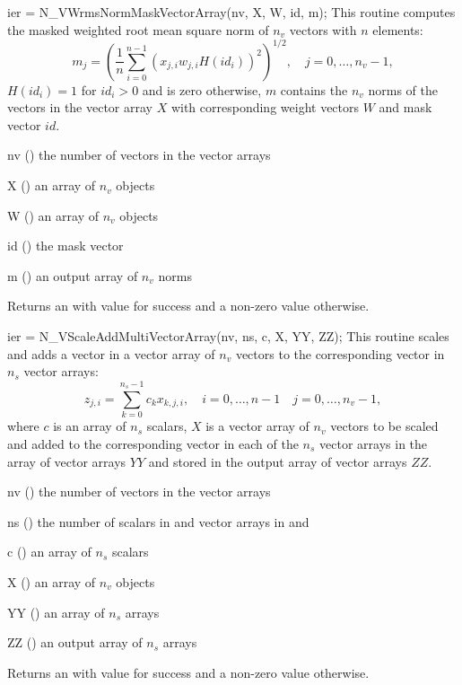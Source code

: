 {
  ier = N\_VWrmsNormMaskVectorArray(nv, X, W, id, m);
}
{
  This routine computes the masked weighted root mean square norm of $n_v$
  vectors with $n$ elements:
  \begin{equation*}
    m_j = \left( \frac1n \sum_{i=0}^{n-1} \left(x_{j,i} w_{j,i}
    H(id_i)\right)^2 \right)^{1/2}, \quad j=0,\ldots,n_v-1,
  \end{equation*}
  $H(id_i)=1$ for $id_i > 0$ and is zero otherwise, $m$ contains the $n_v$
  norms of the vectors in the vector array $X$ with corresponding weight
  vectors $W$ and mask vector $id$.
}
{
  \begin{args}[nv]
  \item[nv] () the number of vectors in the vector arrays
  \item[X] () an array of $n_v$ {\nvector} objects
  \item[W] () an array of $n_v$ {\nvector} objects
  \item[id] () the mask vector
  \item[m] () an output array of $n_v$ norms
  \end{args}
}
{
  Returns an  with value  for success and a non-zero value otherwise.
}
{}

{
  ier = N\_VScaleAddMultiVectorArray(nv, ns, c, X, YY, ZZ);
}
{
  This routine scales and adds a vector in a vector array of $n_v$ vectors to
  the corresponding vector in $n_s$ vector arrays:
  \begin{equation*}
    z_{j,i} = \sum_{k=0}^{n_s-1} c_k x_{k,j,i}, \quad i=0,\ldots,n-1 \quad j=0,\ldots,n_v-1,
  \end{equation*}
  where $c$ is an array of $n_s$ scalars, $X$ is a vector array of $n_v$ vectors
  to be scaled and added to the corresponding vector in each of the $n_s$ vector
  arrays in the array of vector arrays $YY$ and stored in the output array of vector
  arrays $ZZ$.
}
{
  \begin{args}[nv]
  \item[nv] () the number of vectors in the vector arrays
  \item[ns] () the number of scalars in  and vector arrays
    in  and 
  \item[c] () an array of $n_s$ scalars
  \item[X] () an array of $n_v$ {\nvector} objects
  \item[YY] () an array of $n_s$ {\nvector} arrays
  \item[ZZ] () an output array of $n_s$ {\nvector}
    arrays
  \end{args}
}
{
  Returns an  with value  for success and a non-zero value otherwise.
}
{}

